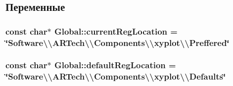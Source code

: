 \subsection{Переменные}
\hypertarget{namespace_global_a5a9ecda094d018a7aedd0e0fea60dcbf}{
\subsubsection[{current\-Reg\-Location}]{\setlength{\rightskip}{0pt plus 5cm}const char$\ast$ Global\-::current\-Reg\-Location = \char`\"{}Software\textbackslash{}\textbackslash{}\-A\-R\-Tech\textbackslash{}\textbackslash{}\-Components\textbackslash{}\textbackslash{}xyplot\textbackslash{}\textbackslash{}\-Preffered\char`\"{}\hspace{0.3cm}{\ttfamily [static]}}}\label{namespace_global_a5a9ecda094d018a7aedd0e0fea60dcbf}
\hypertarget{namespace_global_a275f4535b4758f4da12d3e80d2baad33}{
\subsubsection[{default\-Reg\-Location}]{\setlength{\rightskip}{0pt plus 5cm}const char$\ast$ Global\-::default\-Reg\-Location = \char`\"{}Software\textbackslash{}\textbackslash{}\-A\-R\-Tech\textbackslash{}\textbackslash{}\-Components\textbackslash{}\textbackslash{}xyplot\textbackslash{}\textbackslash{}\-Defaults\char`\"{}\hspace{0.3cm}{\ttfamily [static]}}}\label{namespace_global_a275f4535b4758f4da12d3e80d2baad33}
